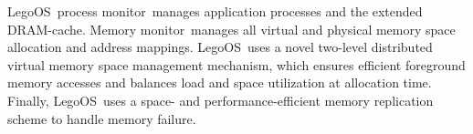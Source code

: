 \documentclass[10pt,times,twocolumn]{z2-article}
\newcommand{\lego}{LegoOS}
\newcommand{\microos}{monitor}
\begin{document}
\lego\ process \microos\ manages application processes and the extended DRAM-cache.
Memory \microos\ manages all virtual and physical memory space allocation and address mappings. 
\lego\ uses a novel two-level distributed virtual memory space management mechanism,
which ensures efficient foreground memory accesses and balances load and space utilization at allocation time.
Finally, \lego\ uses a space- and performance-efficient memory replication scheme to handle memory failure.
\end{document}
